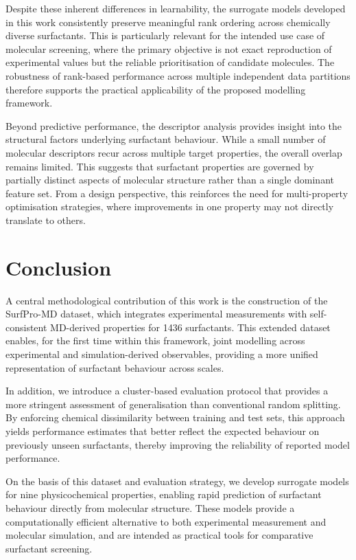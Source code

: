 \documentclass[letterpaper]{article}
\begin{document}
Despite these inherent differences in learnability, the surrogate models developed in this work consistently preserve meaningful rank ordering across chemically diverse surfactants. This is particularly relevant for the intended use case of molecular screening, where the primary objective is not exact reproduction of experimental values but the reliable prioritisation of candidate molecules. The robustness of rank-based performance across multiple independent data partitions therefore supports the practical applicability of the proposed modelling framework.

Beyond predictive performance, the descriptor analysis provides insight into the structural factors underlying surfactant behaviour. While a small number of molecular descriptors recur across multiple target properties, the overall overlap remains limited. This suggests that surfactant properties are governed by partially distinct aspects of molecular structure rather than a single dominant feature set. From a design perspective, this reinforces the need for multi-property optimisation strategies, where improvements in one property may not directly translate to others.


\section{Conclusion}
A central methodological contribution of this work is the construction of the SurfPro-MD dataset, which integrates experimental measurements with self-consistent MD-derived properties for 1436 surfactants. This extended dataset enables, for the first time within this framework, joint modelling across experimental and simulation-derived observables, providing a more unified representation of surfactant behaviour across scales.

In addition, we introduce a cluster-based evaluation protocol that provides a more stringent assessment of generalisation than conventional random splitting. By enforcing chemical dissimilarity between training and test sets, this approach yields performance estimates that better reflect the expected behaviour on previously unseen surfactants, thereby improving the reliability of reported model performance.

On the basis of this dataset and evaluation strategy, we develop surrogate models for nine physicochemical properties, enabling rapid prediction of surfactant behaviour directly from molecular structure. These models provide a computationally efficient alternative to both experimental measurement and molecular simulation, and are intended as practical tools for comparative surfactant screening.
\end{document}

